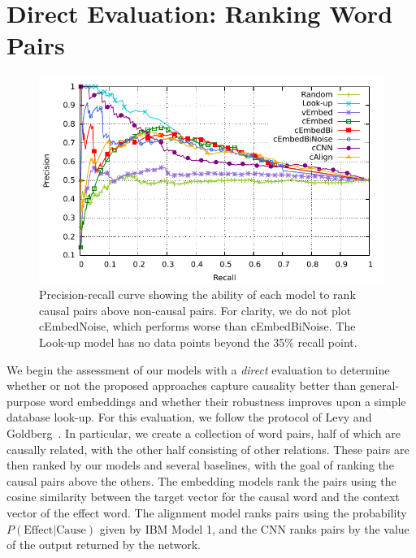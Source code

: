 
\section{Direct Evaluation: Ranking Word Pairs}

\begin{figure}[th!]
\begin{center}
\includegraphics[width=\textwidth]{mainmatter/emnlp2016-causal/direct2.pdf} %
\caption{{\footnotesize Precision-recall curve showing the ability of each model to rank causal pairs above non-causal pairs. For clarity, we do not plot cEmbedNoise, which performs worse than cEmbedBiNoise. The Look-up model has no data points beyond the 35\% recall point.}}
\label{fig:rpcurve_all}
\end{center}
\end{figure}


\label{sec-emnlp2016:directeval}

We begin the assessment of our models with a {\em direct} evaluation to determine whether or not the proposed approaches capture causality better than general-purpose word embeddings and whether their robustness improves upon a simple database look-up.
For this evaluation, we follow the protocol of Levy and Goldberg~\citeyear{levy2014dependency}.  
In particular, we create a collection of word pairs, half of which are causally related, with the other half consisting of other relations. 
These pairs are then ranked by our models and several baselines, with the goal of ranking the causal pairs above the others. 
The embedding models rank the pairs using the cosine similarity between the target vector for the causal word and the context vector of the effect word.  The alignment model ranks pairs using the probability $P(\text{Effect}|\text{Cause})$ given by IBM Model 1, and the CNN ranks pairs by the value of the output returned by the network.

